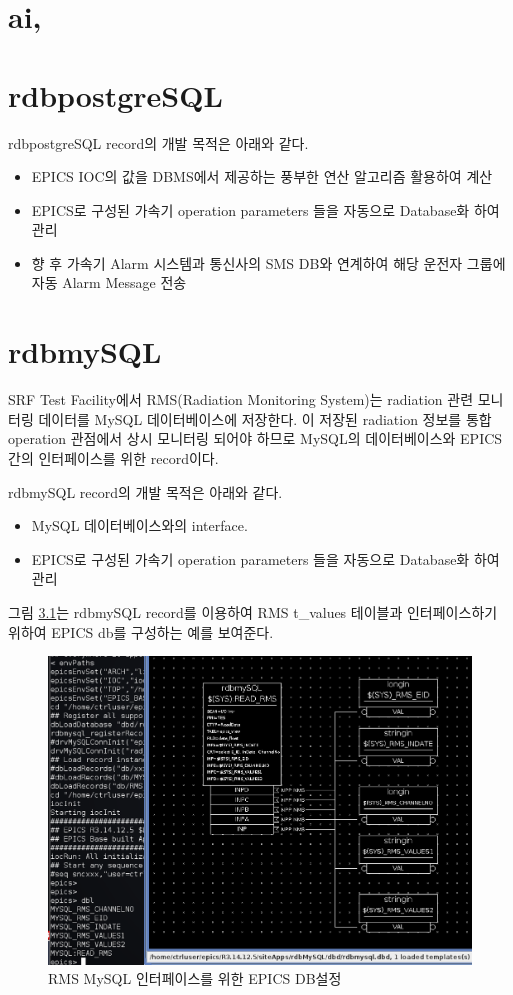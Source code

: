 \documentclass[11pt
  , a4paper
  , article
  , oneside
]{memoir}
\begin{document}
\clearpage


\chapter{ai, }

\chapter{rdbpostgreSQL}

rdbpostgreSQL record의 개발 목적은 아래와 같다.
\begin{itemize}
	\item EPICS IOC의 값을 DBMS에서 제공하는 풍부한 연산 알고리즘 활용하여 계산
	\item EPICS로 구성된 가속기 operation parameters 들을 자동으로 Database화 하여 관리
	\item 향 후 가속기 Alarm 시스템과 통신사의 SMS DB와 연계하여 해당 운전자 그룹에 자동 Alarm Message 전송
\end{itemize}

\chapter{rdbmySQL}
SRF Test Facility에서 RMS(Radiation Monitoring System)는 radiation 관련 모니터링 데이터를 MySQL 데이터베이스에 저장한다. 이 저장된 radiation 정보를 통합 operation 관점에서 상시 모니터링 되어야 하므로 MySQL의 데이터베이스와 EPICS간의 인터페이스를 위한 record이다.

rdbmySQL record의 개발 목적은 아래와 같다.
\begin{itemize}
	\item MySQL 데이터베이스와의 interface.
	\item EPICS로 구성된 가속기 operation parameters 들을 자동으로 Database화 하여 관리
\end{itemize}

그림 \ref{fig:rms_epics_db}는 rdbmySQL record를 이용하여 RMS t\_values 테이블과 인터페이스하기 위하여 EPICS db를 구성하는 예를 보여준다.

\begin{figure}[h!]
	\centering
	\includegraphics[width=1\textwidth]{./images/rms_epics_db.eps}
	\caption{RMS MySQL 인터페이스를 위한 EPICS DB설정}
	\label{fig:rms_epics_db}
\end{figure}
\end{document}
